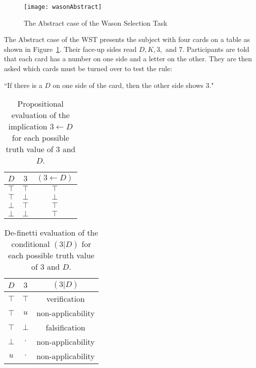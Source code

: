 \begin{figure}
\begin{center}
\texttt{[image: wasonAbstract]}
\caption{The Abstract case of the Wason Selection Task}
\label{fig:wst}
\end{center}

\end{figure}

The Abstract case of the WST presents the subject with four cards on a table as shown in Figure~\ref{fig:wst}. Their face-up sides read $D, K, 3,$ and $7$. Participants are told that each card has a number on one side and a letter on the other. They are then asked which cards must be turned over to test the rule:

\begin{center}
``If there is a $D$ on one side of the card, then the other side shows $3$."
\end{center} 

\begin{table}
\begin{center}


\begin{tabular}{ c c c}
  \textbf{$D$}&  \textbf{$3$}& \textbf{$(3\leftarrow D)$} \\ 
  \hline
 $\top$ & $\top$ & $\top$\\  
 $\top$ & $\bot$ & $\bot$\\  
 $\bot$ & $\top$ & $\top$\\
 $\bot$ & $\bot$ & $\top$
\end{tabular}
\caption{Propositional evaluation of the implication $3 \leftarrow D$ for each possible truth value of $3$ and $D$.}
\label{tbl:wst_impl}
\end{center}
\end{table}

\begin{table}
\begin{center}


\begin{tabular}{ c c c}
  \textbf{$D$}&  \textbf{$3$}& \textbf{$(3|D)$} \\ 
  \hline
 $\top$ & $\top$ & verification\\  
  $\top$ & $u$ & non-applicability\\ 
 $\top$ & $\bot$ & falsification\\  
 $\bot$ & $\cdot$ & non-applicability\\
 $u$ & $\cdot$ & non-applicability
\end{tabular}
\caption{De-finetti evaluation of the conditional $(3|D)$ for each possible truth value of $3$ and $D$.}
\label{tbl:wst_classical}
\end{center}
\end{table}

